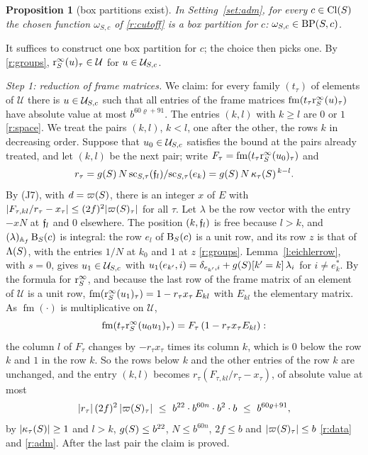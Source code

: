 \documentclass[11pt,a4paper]{article}
\makeatletter
\theoremstyle{plainx}
\newtheorem{proposition}[theorem]{Proposition}
\theoremstyle{uprightx}
\renewenvironment{proof}[1][Proof]{\par\pushQED{\qed}\normalfont\topsep0pt\partopsep0pt
  \trivlist\item[\hskip\labelsep\itshape #1.]\ignorespaces}{\popQED\endtrivlist\@endpefalse}
\newcommand{\fm}[1]{\operatorname{fm}(#1)}                 %
\newcommand{\omS}[2]{\omega_{#1,#2}}                       %
\makeatother
\begin{document}
\begin{proposition}[box partitions exist]\label{p:boxexists}
In Setting~\ref{set:adm}, for every $c\in\mathrm{Cl}(S)$ the chosen function $\omS{S}{c}$ of \ref{r:cutoff} is a box
partition for $c$: $\IsBP{S}{c}{\omS{S}{c}}$.
\end{proposition}
\begin{proof}
It suffices to construct one box partition for $c$; the choice then picks one. By \ref{r:groups},
$\mathrm{r}^{\infty}_{S}(u)_\tau\in\mathcal U$ for $u\in\mathcal{U}_{S,c}$.

\emph{Step 1: reduction of frame matrices.} We claim: for every family $(t_\tau)$ of elements of $\mathcal U$ there
is $u\in\mathcal{U}_{S,c}$ such that all entries of the frame matrices $\fm{t_\tau\rinf{S}(u)_\tau}$ have absolute value at
most $b^{60\varrho+91}$. The entries $(k,l)$ with $k\ge l$ are $0$ or $1$ \ref{r:space}. We treat the pairs
$(k,l)$, $k<l$, one after the other, the rows $k$ in decreasing order. Suppose that $u_0\in\mathcal{U}_{S,c}$ satisfies
the bound at the pairs already treated, and let $(k,l)$ be the next pair; write
$F_\tau=\fm{t_\tau\rinf{S}(u_0)_\tau}$ and
\[r_\tau=g(S)\,N\,\mathrm{sc}_{S,\tau}(\mathfrak{f}_{l})/\mathrm{sc}_{S,\tau}(e_k)=g(S)\,N\,\kappa_{\tau}(S)^{\,k-l}.\]
By (J7), with $d=\varpi(S)$, there is an integer $x$ of $E$ with
$|F_{\tau,kl}/r_\tau-x_\tau|\le(2f)^2|\varpi(S)_\tau|$ for all $\tau$. Let $\lambda$ be the row vector with the entry $-xN$
at $\mathfrak{f}_{l}$ and $0$ elsewhere. The position $(k,\mathfrak{f}_{l})$ is free because $l>k$, and $(\lambda)_{\mathbb{A}_{f}}\,\mathrm{B}_{S}(c)$ is
integral: the row $e_l$ of $\mathrm{B}_{S}(c)$ is a unit row, and its row $z$ is that of $\Lambda(S)$, with the entries
$1/N$ at $k_0$ and $1$ at $z$ \ref{r:groups}. Lemma~\ref{l:eichlerrow}, with $s=0$, gives $u_1\in\mathcal{U}_{S,c}$ with
$u_1(e_{k'},i)=\delta_{e_{k'},i}+g(S)[k'=k]\,\lambda_i$ for $i\ne e^*_k$. By the formula for $\mathrm{r}^{\infty}_{S}$, and because the
last row of the frame matrix of an element of $\mathcal U$ is a unit row, $\fm{\rinf{S}(u_1)_\tau}=1-r_\tau x_\tau\,E_{kl}$
with $E_{kl}$ the elementary matrix. As $\fm{\cdot}$ is multiplicative on $\mathcal U$,
\[\fm{t_\tau\rinf{S}(u_0u_1)_\tau}=F_\tau\,(1-r_\tau x_\tau E_{kl}):\]
the column $l$ of $F_\tau$ changes by $-r_\tau x_\tau$ times its column $k$, which is $0$ below the row $k$ and $1$ in
the row $k$. So the rows below $k$ and the other entries of the row $k$ are unchanged, and the entry $(k,l)$ becomes
$r_\tau(F_{\tau,kl}/r_\tau-x_\tau)$, of absolute value at most
\[|r_\tau|\,(2f)^2\,|\vpS{S}_\tau|\ \le\ b^{22}\cdot b^{60n}\cdot b^{2}\cdot b\ \le\ b^{60\varrho+91},\]
by $|\kappa_{\tau}(S)|\ge1$ and $l>k$, $g(S)\le b^{22}$, $N\le b^{60n}$, $2f\le b$ and $|\varpi(S)_\tau|\le b$
\ref{r:data} and \ref{r:adm}. After the last pair the claim is proved.


\end{proof}
\end{document}
